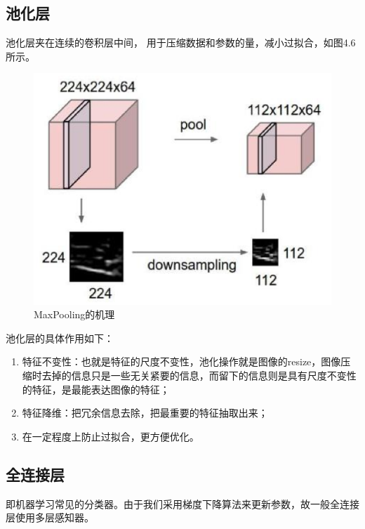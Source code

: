 \documentclass[UTF8, a4paper, 12pt]{report}
\begin{document}
		\subsection{池化层}
			池化层夹在连续的卷积层中间， 用于压缩数据和参数的量，减小过拟合，如图4.6所示。
			\begin{figure}[!h]
			\centering
			\includegraphics[scale=0.5]{./img/Pooling.eps}
			\caption{MaxPooling的机理}
			\label{fig:4.6}
			\end{figure}

			池化层的具体作用如下：
			\begin{enumerate}[itemindent=1em]
				\renewcommand{\labelenumi}{\theenumi)}
				\item 特征不变性：也就是特征的尺度不变性，池化操作就是图像的resize，图像压缩时去掉的信息只是一些无关紧要的信息，而留下的信息则是具有尺度不变性的特征，是最能表达图像的特征；
				\item 特征降维：把冗余信息去除，把最重要的特征抽取出来；
				\item 在一定程度上防止过拟合，更方便优化。
			\end{enumerate}

		\subsection{全连接层}
			即机器学习常见的分类器。由于我们采用梯度下降算法来更新参数，故一般全连接层使用多层感知器。
\end{document}
